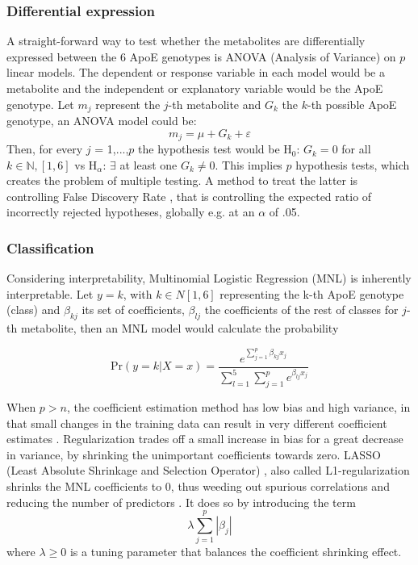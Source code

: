 \documentclass{amsart}
\theoremstyle{plain}
\begin{document}
\subsubsection{Differential expression}
A straight-forward way to test whether the metabolites are differentially expressed between the 6 ApoE genotypes is ANOVA (Analysis of Variance) on $p$ linear models. The dependent or response variable in each model would be a metabolite and the independent or explanatory variable would be the ApoE genotype. Let $m_j$ represent the $j$-th metabolite and $G_k$ the $k$-th possible ApoE genotype, an ANOVA model could be:
\[m_j = \mu + G_k +\varepsilon \]
Then, for every $j$ = 1,...,$p$ the hypothesis test would be H$_0$: $G_k=0$ for all $k\in \mathbb{N}, [1,6]$ vs H$_\alpha$: $\exists$ at least one $G_k\neq0$. This implies $p$ hypothesis tests, which creates the problem of multiple testing. A method to treat the latter is controlling False Discovery Rate \cite{Benjamini1995ControllingTesting}, that is controlling the expected ratio of incorrectly rejected hypotheses, globally e.g. at an $\alpha$ of .05.

\subsubsection{Classification}

Considering interpretability, Multinomial Logistic Regression (MNL) is inherently interpretable. Let $y = k$, with $k \in N[1,6]$ representing the k-th ApoE genotype (class) and $\beta_{kj}$ its set of coefficients,  $\beta_{lj}$ the coefficients of the rest of classes for $j$-th metabolite, then an MNL model would calculate the probability

\[\textrm{Pr}(y=k|X=x) =  \dfrac{e^{\sum_{j=1}^{p}\beta_{kj}x_j}}{\sum_{l=1}^{5}\sum_{j=1}^{p}e^{\beta_{lj}x_j}}\]

When $p > n$, the coefficient estimation method has low bias and high variance, in that small changes in the training data can result in very different coefficient estimates \cite{James2023AnEdition}. Regularization trades off a small increase in bias for a great decrease in variance, by shrinking the unimportant coefficients towards zero. LASSO (Least Absolute Shrinkage and Selection Operator) \cite{Tibshiranit1996RegressionLasso}, also called L1-regularization shrinks the MNL coefficients to 0, thus weeding out spurious correlations and reducing the number of predictors \cite{Tibshiranit1996RegressionLasso}. It does so by introducing the term  \[\lambda\sum_{j=1}^{p}|\beta_j|\] where $\lambda \geq 0$ is a tuning parameter that balances the coefficient shrinking effect.
\end{document}
